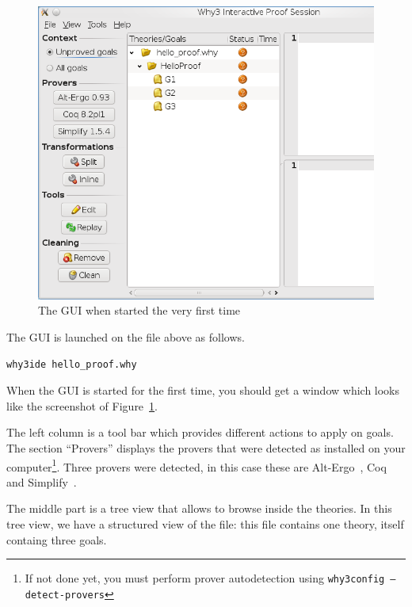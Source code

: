 \begin{figure}[tbp]
  \includegraphics[width=\textwidth]{gui-0-70-1.png}
  \caption{The GUI when started the very first time}
  \label{fig:gui1}
\end{figure}

The GUI is launched on the file above as follows.
\begin{verbatim}
why3ide hello_proof.why
\end{verbatim}
When the GUI is started for the first time, you should get a window
which looks like the screenshot of Figure~\ref{fig:gui1}.

The left column is a tool bar which provides different actions to
apply on goals. The section ``Provers'' displays the provers that were
detected as installed on your computer\footnote{If not done yet, you
  must perform prover autodetection using \texttt{why3config
    --detect-provers}}. Three provers were detected, in this case
these are Alt-Ergo~\cite{ergo}, Coq~\cite{CoqArt} and
Simplify~\cite{simplify05}.

The middle part is a tree view that
allows to browse inside the theories.
In this tree view, we have a structured view of the file: this file
contains one theory, itself containg three goals.


